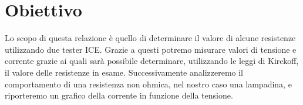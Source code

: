 \section{Obiettivo}

Lo scopo di questa relazione è quello di determinare il valore di alcune resistenze utilizzando due tester ICE. Grazie a questi potremo misurare valori di tensione e corrente grazie ai quali sarà possibile determinare, utilizzando le leggi di Kirckoff, il valore delle resistenze in esame. 
Successivamente analizzeremo il comportamento di una resistenza non ohmica, nel nostro caso una lampadina, e riporteremo un grafico della corrente in funzione della tensione.
